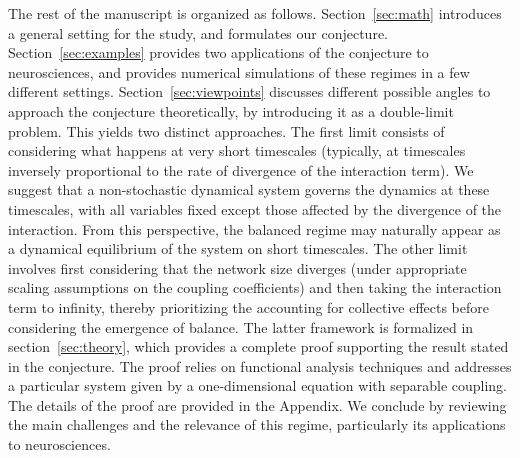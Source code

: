 \documentclass[onefignum,onetabnum]{siamart190516}
\newcommand{\1}{\mathbbm{1}}
\newcommand{\review}[1]{\textcolor{midblue}{ #1}}
\renewcommand{\review}[1]{{ #1}}
\begin{document}
\review{The rest of the manuscript is organized as follows. Section~\ref{sec:math} introduces a general setting for the study, and formulates our conjecture. Section~\ref{sec:examples} provides two applications of the conjecture to neurosciences, and provides numerical simulations of these regimes in a few different settings. Section~\ref{sec:viewpoints} discusses different possible angles to approach the conjecture theoretically, by introducing it as a double-limit problem. This yields two distinct approaches. The first limit consists of considering what happens at very short timescales (typically, at timescales inversely proportional to the rate of divergence of the interaction term). We suggest that a non-stochastic dynamical system governs the dynamics at these timescales, with all variables fixed except those affected by the divergence of the interaction. From this perspective, the balanced regime may naturally appear as a dynamical equilibrium of the system on short timescales. The other limit involves first considering that the network size diverges (under appropriate scaling assumptions on the coupling coefficients) and then taking the interaction term to infinity, thereby prioritizing the accounting for collective effects before considering the emergence of balance. The latter framework is formalized in section~\ref{sec:theory}, which provides a complete proof supporting the result stated in the conjecture. The proof relies on functional analysis techniques and addresses a particular system given by a one-dimensional equation with separable coupling. The details of the proof are provided in the Appendix. We conclude by reviewing the main challenges and the relevance of this regime, particularly its applications to neurosciences. }
\end{document}

